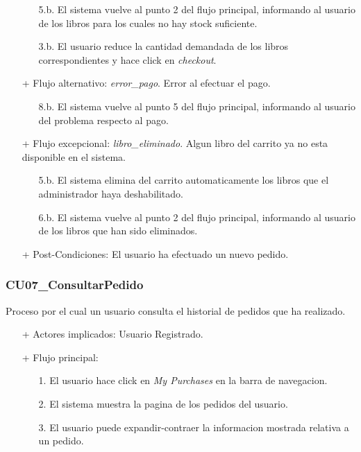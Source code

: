 \documentclass[a4paper]{report}
\begin{document}
\begin{itemize}
                    \begin{itemize}
                        \item[5.b.] El sistema vuelve al punto 2 del flujo principal, informando al usuario de los libros para los cuales no hay stock suficiente.
                        \item[3.b.] El usuario reduce la cantidad demandada de los libros correspondientes y hace click en \emph{checkout}.
                    \end{itemize}
                    \item[+] Flujo alternativo: \emph{error\_pago}. Error al efectuar el pago.
                    \begin{itemize}
                        \item[8.b.] El sistema vuelve al punto 5 del flujo principal, informando al usuario del problema respecto al pago.
                    \end{itemize}
                    \item[+] Flujo excepcional: \emph{libro\_eliminado}. Algun libro del carrito ya no esta disponible en el sistema.
                    \begin{itemize}
                        \item[5.b.] El sistema elimina del carrito automaticamente los libros que el administrador haya deshabilitado.
                        \item[6.b.] El sistema vuelve al punto 2 del flujo principal, informando al usuario de los libros que han sido eliminados.
                    \end{itemize}
                    \item[+] Post-Condiciones: El usuario ha efectuado un nuevo pedido.
                \end{itemize}

            \subsubsection{CU07\_ConsultarPedido}
                Proceso por el cual un usuario consulta el historial de pedidos que ha realizado.
                \begin{itemize}
                    \item[+] Actores implicados: Usuario Registrado.
                    \item[+] Flujo principal:
                    \begin{enumerate}
                        \item[1.] El usuario hace click en \emph{My Purchases} en la barra de navegacion.
                        \item[2.] El sistema muestra la pagina de los pedidos del usuario.
                        \item[3.] El usuario puede expandir-contraer la informacion mostrada relativa a un pedido.
                    \end{enumerate}
                \end{itemize}
\end{document}
